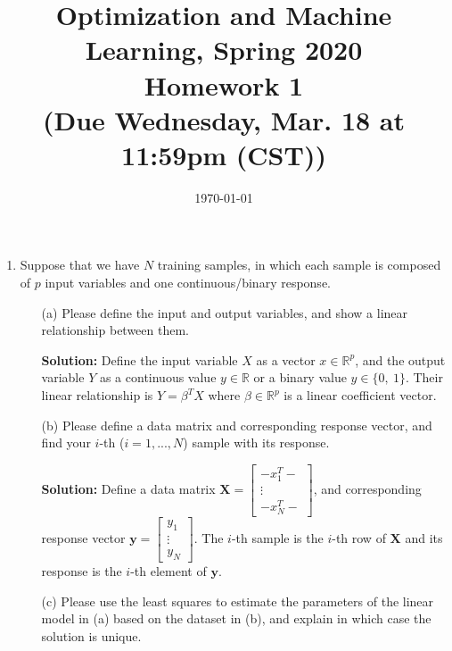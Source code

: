 \documentclass[10pt]{article}
\begin{document}
\date{\today}
\title{Optimization and Machine Learning, Spring 2020 \\
Homework 1\\
\small (Due Wednesday, Mar. 18 at 11:59pm (CST))}
\maketitle
\begin{enumerate}[1.]

		\item  Suppose that we have $N$ training samples, in which
		each sample is composed of $p$ input variables and one continuous/binary response.
		\begin{itemize}
			\item[(a)] Please define the input and output variables, and show a linear relationship between them.~
			
			\textbf{Solution:} Define the input variable $X$ as a vector $x \in \mathbb{R}^p$, and the output variable $Y$ as a continuous value $y\in \mathbb{R}$ 
			or a binary value $y \in \{0,\ 1\}$. Their linear relationship is $Y=\beta^TX$ where $\beta \in \mathbb{R}^p$ is a linear coefficient vector.\\
			
			
			
			\item[(b)] Please define a data matrix and corresponding response vector, and find your $i$-th ($i=1,...,N$) sample with its response.~
			
			\textbf{Solution:} Define a data matrix $\mathbf{X}=\left[\begin{array}{c}-x_{1}^{T}- \\ \vdots \\ -x_{N}^{T}-\end{array}\right]$, 
			and corresponding response vector $\mathbf{y}=\left[\begin{array}{c}y_{1} \\ \vdots \\ y_{N}\end{array}\right]$. 
				The $i$-th sample is the $i$-th row of $\mathbf{X}$ and its response is the $i$-th element of $\mathbf{y}$.\\
			

			\item[(c)] Please use the least squares to estimate the parameters of the linear model in (a) based on the dataset in (b), 
			and explain in which case the solution is unique.~
			

\end{itemize}
\end{enumerate}
\end{document}
